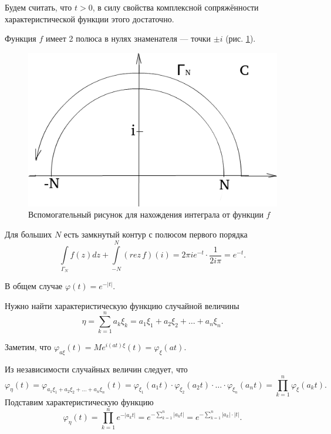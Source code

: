 Будем считать, что $t > 0$,
в силу свойства комплексной сопряжённости характеристической функции этого достаточно.

Функция $f$ имеет 2 полюса в нулях знаменателя --- точки $ \pm i$ (рис. \ref{fig:1522}).

\begin{figure}[h!]
  \centering
  \includegraphics[width=.4\textwidth]{./pictures/15_22.png}
  \caption{Вспомогательный рисунок для нахождения интеграла от функции $f$}
  \label{fig:1522}
\end{figure}

Для больших $N$ есть замкнутый контур с полюсом первого порядка
$$ \int \limits_{ \Gamma_N} f \left( z \right) dz +
\int \limits_{- N}^N \left( rez \, f \right) \left( i \right) =
  2 \pi ie^{- t} \cdot \frac{1}{2i \pi } =
  e^{- t}.$$

В общем случае $ \varphi \left( t \right) = e^{- \left| t \right| }$.

Нужно найти характеристическую функцию случайной величины
$$ \eta =
  \sum \limits_{k = 1}^n a_k \xi_k =
  a_1 \xi_1 + a_2 \xi_2 + \dotsc + a_n \xi_n.$$

Заметим, что
$ \varphi_{a \xi } \left( t \right) =
  Me^{i \left( at \right) \xi } \left( t \right) =
  \varphi_{ \xi } \left( at \right) $.

Из независимости случайных величин следует, что
$$ \varphi_{ \eta } \left( t \right) =
  \varphi_{a_1 \xi_1 + a_2 \xi_2 + \dotsc + a_n \xi_n} \left( t \right) =
  \varphi_{ \xi_1} \left( a_1 t \right) \cdot \varphi_{ \xi_2} \left( a_2 t \right) \cdot
  \dotsc \cdot \varphi_{ \xi_n} \left( a_n t \right) =
  \prod \limits_{k = 1}^n \varphi_{ \xi } \left( a_k t \right).$$
Подставим характеристическую функцию
$$ \varphi_{ \eta } \left( t \right) =
  \prod \limits_{k = 1}^n e^{- \left| a_k t \right| } =
  e^{- \sum \limits_{k = 1}^n \left| a_k t \right| } =
  e^{- \sum \limits_{k = 1}^n \left| a_k \right| \cdot \left| t \right| }.$$

